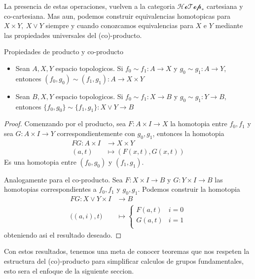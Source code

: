 La presencia de estas operaciones, vuelven a la categoria
\(\mathscr{HoTop}_*\) cartesiana y co-cartesiana. Mas aun, podemos
construir equivalencias homotopicas para \(X \times Y,\ X \vee Y\)
siempre y cuando conozcamos equivalencias para \(X\) e \(Y\) mediante
las propiedades universales del (co)-producto.

\begin{teorema}
  Propiedades de producto y co-producto
  \begin{itemize}
    \item Sean \(A, X, Y\) espacio topologicos. Si \(f_0 \sim f_1 : A \to
      X\) y \(g_0 \sim g_1 : A \to Y\), entonces \((f_0 , g_0) \sim (f_1
      , g_1): A \to X \times Y\)
    \item Sean \(B, X, Y\) espacio topologicos. Si \(f_0 \sim f_1 : X \to
      B\) y \(g_0 \sim g_1 : Y \to B\), entonces \(\{f_0 , g_0\} \sim
      \{f_1 , g_1\} : X \vee Y \to B\)
  \end{itemize}
\end{teorema}
\begin{proof}
Comenzando por el producto, sea \(F : A \times I \to X\) la homotopia
entre \(f_0 , f_1\) y sea \(G : A \times I \to Y\)
correspondientemente con \(g_0, g_1\), entonces la homotopia
\begin{align*}
  FG : A \times I &\to X \times Y \\
       (a, t) &\mapsto (F(x,t) , G(x,t))
\end{align*}
Es una homotopia entre \((f_0 , g_0)\) y \((f_1 , g_1)\).

Analogamente para el co-producto. Sea \(F : X \times I \to B\) y \(G : Y
\times I \to B\) las homotopias correspondientes a \(f_0 , f_1\) y \(g_0
, g_1\). Podemos construir la homotopia
\begin{align*}
  FG : X \vee Y \times I &\to B \\
  \big((a,i) , t \big) &\mapsto
                \begin{cases}
                  F(a,t) & i = 0 \\
                  G(a,t) & i = 1 \\
                \end{cases}
\end{align*}
obteniendo asi el resultado deseado.
\end{proof}

Con estos resultados, tenemos una meta de conocer teoremas que nos
respeten la estructura del (co)-producto para simplificar calculos de
grupos fundamentales, esto sera el enfoque de la siguiente seccion.